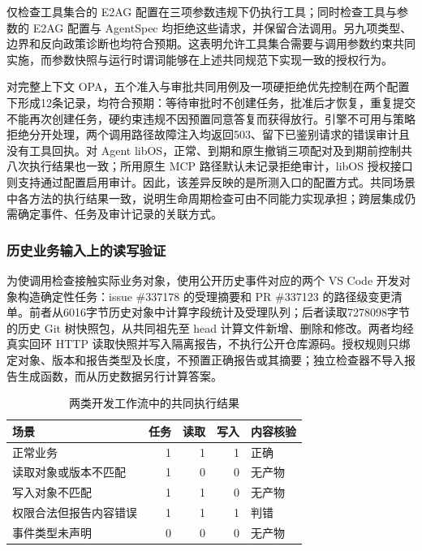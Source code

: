 仅检查工具集合的 E2AG 配置在三项参数违规下仍执行工具；同时检查工具与参数的 E2AG 配置与 AgentSpec 均拒绝这些请求，并保留合法调用。另九项类型、边界和反向政策诊断也均符合预期。这表明允许工具集合需要与调用参数约束共同实施，而参数快照与运行时谓词能够在上述共同规范下实现一致的授权行为。

对完整上下文 OPA，五个准入与审批共同用例及一项硬拒绝优先控制在两个配置下形成12条记录，均符合预期：等待审批时不创建任务，批准后才恢复，重复提交不能再次创建任务，硬约束违规不因预置同意答复而获得放行。引擎不可用与策略拒绝分开处理，两个调用路径故障注入均返回503、留下已鉴别请求的错误审计且没有工具回执。对 Agent libOS，正常、到期和原生撤销三项配对及到期前控制共八次执行结果也一致；所用原生 MCP 路径默认未记录拒绝审计，libOS 授权接口则支持通过配置启用审计。因此，该差异反映的是所测入口的配置方式。共同场景中各方法的执行结果一致，说明生命周期检查可由不同能力实现承担；跨层集成仍需确定事件、任务及审计记录的关联方式。

\subsubsection{历史业务输入上的读写验证}
\label{sec:business-rr022}

为使调用检查接触实际业务对象，使用公开历史事件对应的两个 VS Code 开发对象构造确定性任务：issue \#337178 的受理摘要和 PR \#337123 的路径级变更清单。前者从6016字节历史对象中计算字段统计及受理队列；后者读取7278098字节的历史 Git 树快照包，从共同祖先至 head 计算文件新增、删除和修改。两者均经真实回环 HTTP 读取快照并写入隔离报告，不执行公开仓库源码。授权规则只绑定对象、版本和报告类型及长度，不预置正确报告或其摘要；独立检查器不导入报告生成函数，而从历史数据另行计算答案。

\begin{table}[htbp]
\centering
\caption{两类开发工作流中的共同执行结果}
\label{tab:business-rr022}
\small
\begin{tabular}{p{50mm}rrrp{31mm}}
\toprule
场景 & 任务 & 读取 & 写入 & 内容核验 \\
\midrule
正常业务 & 1 & 1 & 1 & 正确 \\
读取对象或版本不匹配 & 1 & 0 & 0 & 无产物 \\
写入对象不匹配 & 1 & 1 & 0 & 无产物 \\
权限合法但报告内容错误 & 1 & 1 & 1 & 判错 \\
事件类型未声明 & 0 & 0 & 0 & 无产物 \\
\bottomrule
\end{tabular}
\end{table}


